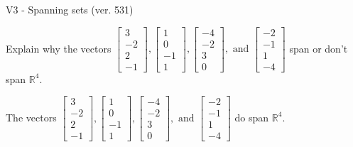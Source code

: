 \begin{exercise}
  \begin{exerciseTitle}V3 - Spanning sets (ver. 531)\end{exerciseTitle}
  \begin{exerciseStatement}
    Explain why the vectors \(\left[\begin{array}{r}
3 \\
-2 \\
2 \\
-1
\end{array}\right] , \left[\begin{array}{r}
1 \\
0 \\
-1 \\
1
\end{array}\right] , \left[\begin{array}{r}
-4 \\
-2 \\
3 \\
0
\end{array}\right] , \text{ and } \left[\begin{array}{r}
-2 \\
-1 \\
1 \\
-4
\end{array}\right]\) span or don't span \(\mathbb{R}^4\). 
	


  \end{exerciseStatement}
  \begin{exerciseAnswer}
   The vectors \(\left[\begin{array}{r}
3 \\
-2 \\
2 \\
-1
\end{array}\right] , \left[\begin{array}{r}
1 \\
0 \\
-1 \\
1
\end{array}\right] , \left[\begin{array}{r}
-4 \\
-2 \\
3 \\
0
\end{array}\right] , \text{ and } \left[\begin{array}{r}
-2 \\
-1 \\
1 \\
-4
\end{array}\right]\) 
  	 do  
	span \(\mathbb{R}^4\).
  


  \end{exerciseAnswer}
\end{exercise}